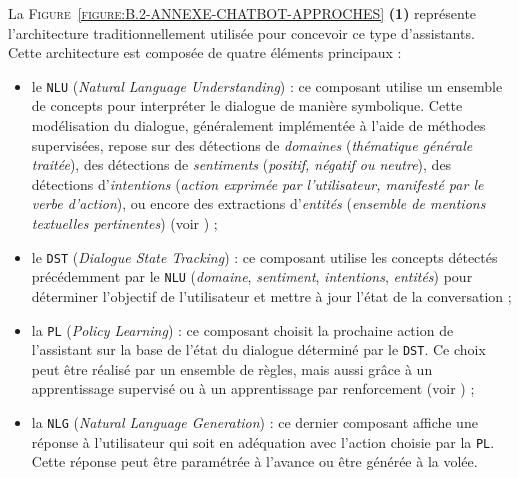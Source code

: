 		La \textsc{Figure~\ref{figure:B.2-ANNEXE-CHATBOT-APPROCHES}} \textbf{(1)} représente l'architecture traditionnellement utilisée pour concevoir ce type d'assistants.
		Cette architecture est composée de quatre éléments principaux :
		\begin{itemize}
			\item le \textcolor{colorCarrotOrange}{\texttt{NLU}} (\textit{Natural Language Understanding}) :
				ce composant utilise un ensemble de concepts pour interpréter le dialogue de manière symbolique.
				Cette modélisation du dialogue, généralement implémentée à l'aide de méthodes supervisées, repose sur des détections de \textit{domaines} (\textit{thématique générale traitée}), des détections de \textit{sentiments} (\textit{positif, négatif ou neutre}), des détections d'\textit{intentions} (\textit{action exprimée par l'utilisateur, manifesté par le verbe d'action}), ou encore des extractions d'\textit{entités} (\textit{ensemble de mentions textuelles pertinentes}) (voir \cite{adamopoulou-moussiades:2020:overview-chatbot-technology}) ;
			\item le \textcolor{colorDarkPastelGreen}{\texttt{DST}} (\textit{Dialogue State Tracking}) :
				ce composant utilise les concepts détectés précédemment par le \texttt{NLU} (\textit{domaine}, \textit{sentiment}, \textit{intentions}, \textit{entités}) pour déterminer l'objectif de l'utilisateur et mettre à jour l'état de la conversation ;
			\item la \textcolor{colorDarkPastelGreen}{\texttt{PL}} (\textit{Policy Learning}) : 
				ce composant choisit la prochaine action de l'assistant sur la base de l'état du dialogue déterminé par le \texttt{DST}.
				Ce choix peut être réalisé par un ensemble de règles, mais aussi grâce à un apprentissage supervisé ou à un apprentissage par renforcement (voir \cite{brabra-etal:2022:dialogue-management-conversational}) ;
			\item la \textcolor{colorSilverLakeBlue}{\texttt{NLG}} (\textit{Natural Language Generation}) :
				ce dernier composant affiche une réponse à l'utilisateur qui soit en adéquation avec l'action choisie par la \texttt{PL}.
				Cette réponse peut être paramétrée à l'avance ou être générée à la volée.
		\end{itemize}
		
